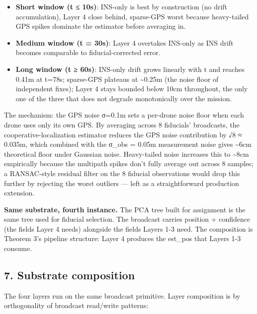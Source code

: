 \begin{itemize}
\tightlist
\item
  \textbf{Short window (t ≤ 10s)}: INS-only is best by construction (no
  drift accumulation), Layer 4 close behind, sparse-GPS worst because
  heavy-tailed GPS spikes dominate the estimator before averaging in.
\item
  \textbf{Medium window (t = 30s)}: Layer 4 overtakes INS-only as INS
  drift becomes comparable to fiducial-corrected error.
\item
  \textbf{Long window (t ≥ 60s)}: INS-only drift grows linearly with t
  and reaches 0.41m at t=78s; sparse-GPS plateaus at
  \textasciitilde0.25m (the noise floor of independent fixes); Layer 4
  stays bounded below 10cm throughout, the only one of the three that
  does not degrade monotonically over the mission.
\end{itemize}

The mechanism: the GPS noise σ=0.1m sets a per-drone noise floor when
each drone uses only its own GPS. By averaging across 8 fiducials'
broadcasts, the cooperative-localization estimator reduces the GPS noise
contribution by √8 ≈ 0.035m, which combined with the σ\_obs = 0.05m
measurement noise gives \textasciitilde6cm theoretical floor under
Gaussian noise. Heavy-tailed noise increases this to \textasciitilde8cm
empirically because the multipath spikes don't fully average out across
8 samples; a RANSAC-style residual filter on the 8 fiducial observations
would drop this further by rejecting the worst outliers --- left as a
straightforward production extension.

\textbf{Same substrate, fourth instance.} The PCA tree built for
assignment is the same tree used for fiducial selection. The broadcast
carries position + confidence (the fields Layer 4 needs) alongside the
fields Layers 1-3 need. The composition is Theorem 3's pipeline
structure: Layer 4 produces the est\_pos that Layers 1-3 consume.

\subsection{7. Substrate composition}\label{substrate-composition}

The four layers run on the same broadcast primitive. Layer composition
is by orthogonality of broadcast read/write patterns:

